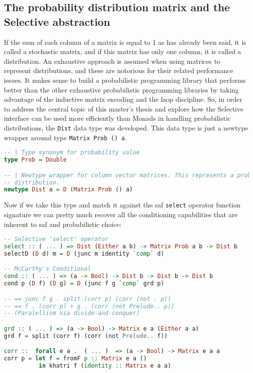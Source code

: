\documentclass[
  oneside,
  11pt, a4paper,
  footinclude=true,
  headinclude=true,
  cleardoublepage=empty
]{scrbook}
\theoremstyle{definition}
\theoremstyle{definition}
\begin{document}
        \subsection{The probability distribution matrix and the Selective abstraction}
        
        If the sum of each column of a matrix is equal to 1 as has already been said, it is called a stochastic matrix, and if this matrix has only one column, it is called a distribution. An exhaustive approach is assumed when using matrices to represent distributions, and these are notorious for their related performance issues. It makes sense to build a probabilistic programming library that performs better than the other exhaustive probabilistic programming libraries by taking advantage of the inductive matrix encoding and the \gls{laop} discipline. So, in order to address the central topic of this master's thesis and explore how the Selective interface can be used more efficiently than Monads in handling probabilistic distributions, the \texttt{Dist} data type was developed. This data type is just a newtype wrapper around type \texttt{Matrix Prob () a}.
        
        \begin{lstlisting}[language=Haskell, caption={Dist type alias},captionpos=b]
-- | Type synonym for probability value
type Prob = Double

-- | Newtype wrapper for column vector matrices. This represents a probability
-- distribution.
newtype Dist a = D (Matrix Prob () a)
        \end{lstlisting}
        
        Now if we take this type and match it against the \gls{saf} \texttt{select} operator function signature we can pretty much recover all the conditioning capabilities that are inherent to \gls{saf} and probabilistic choice:
        
        \begin{lstlisting}[language=Haskell, caption={Dist - \texttt{select} and \texttt{cond} operators},captionpos=b]
-- Selective 'select' operator
select :: ( ... ) => Dist (Either a b) -> Matrix Prob a b -> Dist b 
selectD (D d) m = D (junc m identity `comp` d)

-- McCarthy's Conditional
cond :: ( ... ) => (a -> Bool) -> Dist b -> Dist b -> Dist b
cond p (D f) (D g) = D (junc f g `comp` grd p)

-- == junc f g . split (corr p) (corr (not . p))
-- == f . (corr p) + g . (corr (not Prelude.. p))
-- (Paralellism via divide-and-conquer)

grd :: ( ... ) => (a -> Bool) -> Matrix e a (Either a a)
grd f = split (corr f) (corr (not Prelude.. f))

corr ::  forall e a .  ( ... )  => (a -> Bool) -> Matrix e a a
corr p = let f = fromF p :: Matrix e a ()
          in khatri f (identity :: Matrix e a a)
          
        \end{lstlisting}{}
        
\end{document}
